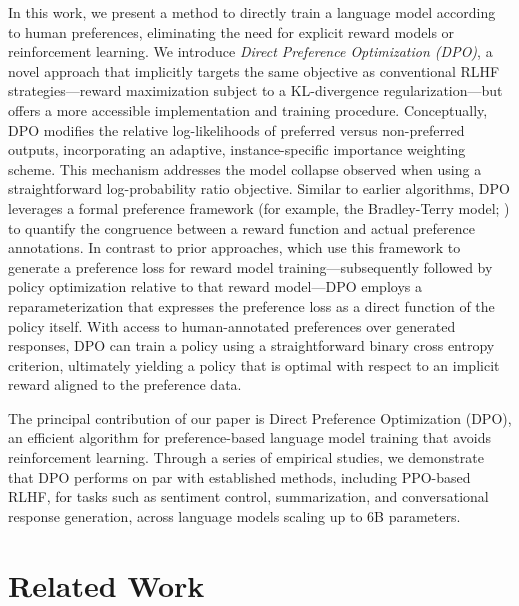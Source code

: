 In this work, we present a method to directly train a language model according to human preferences, eliminating the need for explicit reward models or reinforcement learning. We introduce \textit{{Direct Preference Optimization} (DPO)}, a novel approach that implicitly targets the same objective as conventional RLHF strategies—reward maximization subject to a KL-divergence regularization—but offers a more accessible implementation and training procedure. Conceptually, DPO modifies the relative log-likelihoods of preferred versus non-preferred outputs, incorporating an adaptive, instance-specific importance weighting scheme. This mechanism addresses the model collapse observed when using a straightforward log-probability ratio objective. Similar to earlier algorithms, DPO leverages a formal preference framework (for example, the Bradley-Terry model; \cite{bradley1952rankanalysis}) to quantify the congruence between a reward function and actual preference annotations. In contrast to prior approaches, which use this framework to generate a preference loss for reward model training—subsequently followed by policy optimization relative to that reward model—DPO employs a reparameterization that expresses the preference loss as a direct function of the policy itself. With access to human-annotated preferences over generated responses, DPO can train a policy using a straightforward binary cross entropy criterion, ultimately yielding a policy that is optimal with respect to an implicit reward aligned to the preference data.

The principal contribution of our paper is Direct Preference Optimization (DPO), an efficient algorithm for preference-based language model training that avoids reinforcement learning. Through a series of empirical studies, we demonstrate that DPO performs on par with established methods, including PPO-based RLHF, for tasks such as sentiment control, summarization, and conversational response generation, across language models scaling up to 6B parameters.

\section{Related Work}

